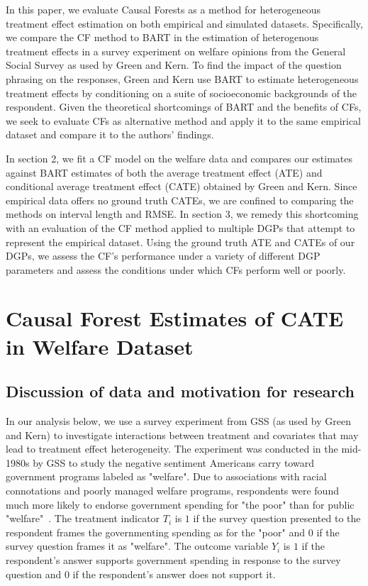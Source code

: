\documentclass[12pt]{article}
\begin{document}
In this paper, we evaluate Causal Forests as a method for heterogeneous
treatment effect estimation on both empirical and simulated datasets.
Specifically, we compare the CF method to BART in the estimation of heterogenous
treatment effects in a survey experiment on welfare opinions from the General
Social Survey as used by Green and Kern. To find the impact of the question
phrasing on the responses, Green and Kern use BART to estimate heterogeneous
treatment effects by conditioning on a suite of socioeconomic backgrounds of the
respondent. Given the theoretical shortcomings of BART and the benefits of CFs,
we seek to evaluate CFs as alternative method and apply it to the same empirical
dataset and compare it to the authors' findings. 

In section 2, we fit a CF model on the welfare data and compares our estimates
against BART estimates of both the average treatment effect (ATE) and
conditional average treatment effect (CATE) obtained by Green and Kern. Since
empirical data offers no ground truth CATEs, we are confined to comparing the
methods on interval length and RMSE. In section 3, we remedy this shortcoming
with an evaluation of the CF method applied to multiple DGPs that attempt to
represent the empirical dataset. Using the ground truth ATE and CATEs of our
DGPs, we assess the CF's performance under a variety of different DGP parameters
and assess the conditions under which CFs perform well or poorly. \\

\section{Causal Forest Estimates of CATE in Welfare Dataset} 

\subsection{Discussion of data and motivation for research} 
In our analysis below, we use a survey experiment from GSS (as used by Green and
Kern) to investigate interactions between treatment and covariates that may lead
to treatment effect heterogeneity. The experiment was conducted in the mid-1980s
by GSS to study the negative sentiment Americans carry toward government
programs labeled as "welfare". Due to associations with racial connotations and
poorly managed welfare programs, respondents were found much more likely to
endorse government spending for "the poor" than for public
"welfare"~\cite{rasinski1989}. The treatment indicator $T_i$ is $1$ if the
survey question presented to the respondent frames the governmenting spending as
for the "poor" and $0$ if the survey question frames it as "welfare". The
outcome variable $Y_i$ is $1$ if the respondent's answer supports government
spending in response to the survey question and $0$ if the respondent's answer
does not support it. \\
\end{document}
